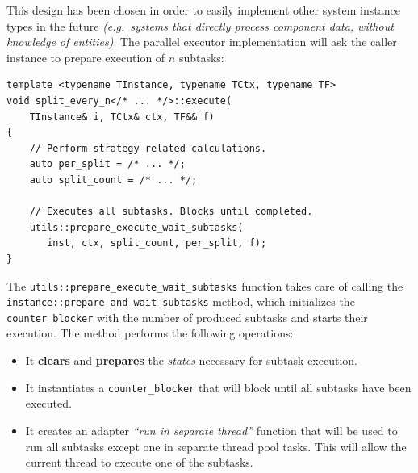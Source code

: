 \documentclass[oneside, 12pt, a4paper, openany]{book}
\begin{document}
This design has been chosen in order to easily implement other system
instance types in the future \emph{(e.g.~systems that directly process
component data, without knowledge of entities)}. The parallel executor
implementation will ask the caller instance to prepare execution of
\(n\) subtasks:

\begin{verbatim}
template <typename TInstance, typename TCtx, typename TF>
void split_every_n</* ... */>::execute(
    TInstance& i, TCtx& ctx, TF&& f)
{
    // Perform strategy-related calculations.
    auto per_split = /* ... */;
    auto split_count = /* ... */;

    // Executes all subtasks. Blocks until completed.
    utils::prepare_execute_wait_subtasks(
       inst, ctx, split_count, per_split, f);
}
\end{verbatim}

The
\texttt{utils::prepare_execute_wait_subtasks}
function takes care of calling the
\texttt{instance::prepare_and_wait_subtasks}
method, which initializes the
\texttt{counter_blocker}
with the number of produced subtasks and starts their execution. The
method performs the following operations:

\begin{itemize}
\item
  It \textbf{clears} and \textbf{prepares} the
  \protect\hyperlink{storage_state}{\emph{states}} necessary for subtask
  execution.
\item
  It instantiates a
  \texttt{counter_blocker}
  that will block until all subtasks have been executed.
\item
  It creates an adapter \emph{``run in separate thread''} function that
  will be used to run all subtasks except one in separate thread pool
  tasks. This will allow the current thread to execute one of the
  subtasks.
\end{itemize}
\end{document}
